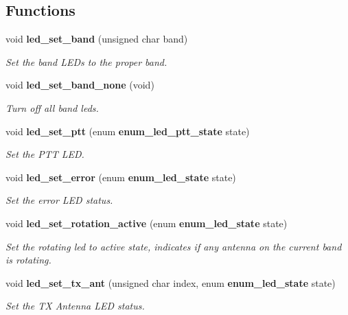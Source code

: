 \subsection*{Functions}
\begin{CompactItemize}
\item 
void {\bf led\_\-set\_\-band} (unsigned char band)
\begin{CompactList}\small\item\em Set the band LEDs to the proper band. \item\end{CompactList}\item 
void {\bf led\_\-set\_\-band\_\-none} (void)\label{led__control_8h_bfdee5775ab42a7048468f5ad4dd0607}

\begin{CompactList}\small\item\em Turn off all band leds. \item\end{CompactList}\item 
void {\bf led\_\-set\_\-ptt} (enum {\bf enum\_\-led\_\-ptt\_\-state} state)
\begin{CompactList}\small\item\em Set the PTT LED. \item\end{CompactList}\item 
void {\bf led\_\-set\_\-error} (enum {\bf enum\_\-led\_\-state} state)
\begin{CompactList}\small\item\em Set the error LED status. \item\end{CompactList}\item 
void {\bf led\_\-set\_\-rotation\_\-active} (enum {\bf enum\_\-led\_\-state} state)
\begin{CompactList}\small\item\em Set the rotating led to active state, indicates if any antenna on the current band is rotating. \item\end{CompactList}\item 
void {\bf led\_\-set\_\-tx\_\-ant} (unsigned char index, enum {\bf enum\_\-led\_\-state} state)
\begin{CompactList}\small\item\em Set the TX Antenna LED status. \item\end{CompactList}\item 

\end{CompactItemize}
